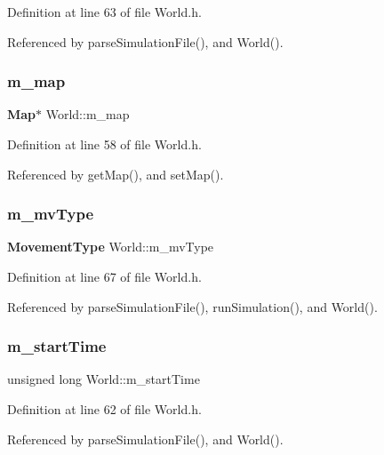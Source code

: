 Definition at line 63 of file World.\+h.



Referenced by parse\+Simulation\+File(), and World().

\mbox{\label{class_world_ae1e6f62c5b282e94ffdcaab58fcb3fb4}} 
\subsubsection{m\+\_\+map}
{\footnotesize\ttfamily \textbf{ Map}$\ast$ World\+::m\+\_\+map\hspace{0.3cm}{\ttfamily [private]}}



Definition at line 58 of file World.\+h.



Referenced by get\+Map(), and set\+Map().

\mbox{\label{class_world_a9fcf012ce7262edf5646f0720ffd7666}} 
\subsubsection{m\+\_\+mv\+Type}
{\footnotesize\ttfamily \textbf{ Movement\+Type} World\+::m\+\_\+mv\+Type\hspace{0.3cm}{\ttfamily [private]}}



Definition at line 67 of file World.\+h.



Referenced by parse\+Simulation\+File(), run\+Simulation(), and World().

\mbox{\label{class_world_a5b46814e7da7222730be62154bf10008}} 
\subsubsection{m\+\_\+start\+Time}
{\footnotesize\ttfamily unsigned long World\+::m\+\_\+start\+Time\hspace{0.3cm}{\ttfamily [private]}}



Definition at line 62 of file World.\+h.



Referenced by parse\+Simulation\+File(), and World().

